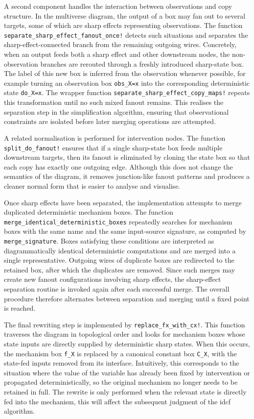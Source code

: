 \documentclass[a4paper]{report}
\begin{document}
A second component handles the interaction between observations and copy structure. In the multiverse diagram, the output of a box may fan out to several targets, some of which are sharp effects representing observations. The function \texttt{separate\_sharp\_effect\_fanout\_once!} detects such situations and separates the sharp-effect-connected branch from the remaining outgoing wires. 
Concretely, when an output feeds both a sharp effect and other downstream nodes, the non-observation branches are rerouted through a freshly introduced sharp-state box. 
The label of this new box is inferred from the observation whenever possible, for example turning an observation box \texttt{obs\_X=x} into the corresponding deterministic state \texttt{do\_X=x}. The wrapper function \texttt{separate\_sharp\_effect\_copy\_maps!} repeats this transformation until no such mixed fanout remains. This realises the separation step in the simplification algorithm, ensuring that observational constraints are isolated before later merging operations are attempted.

A related normalisation is performed for intervention nodes. 
The function \texttt{split\_do\_fanout!} ensures that if a single sharp-state box feeds multiple downstream targets, then its fanout is eliminated by cloning the state box so that each copy has exactly one outgoing edge. 
Although this does not change the semantics of the diagram, it removes junction-like fanout patterns and produces a cleaner normal form that is easier to analyse and visualise.

Once sharp effects have been separated, the implementation attempts to merge duplicated deterministic mechanism boxes. 
The function \texttt{merge\_identical\_deterministic\_boxes} repeatedly searches for mechanism boxes with the same name and the same input-source signature, as computed by \texttt{merge\_signature}. Boxes satisfying these conditions are interpreted as diagrammatically identical deterministic computations and are merged into a single representative. 
Outgoing wires of duplicate boxes are redirected to the retained box, after which the duplicates are removed. 
Since such merges may create new fanout configurations involving sharp effects, the sharp-effect separation routine is invoked again after each successful merge. The overall procedure therefore alternates between separation and merging until a fixed point is reached.

The final rewriting step is implemented by \texttt{replace\_fx\_with\_cx!}. This function traverses the diagram in topological order and looks for mechanism boxes whose state inputs are directly supplied by deterministic sharp states. When this occurs, the mechanism box \texttt{f\_X} is replaced by a canonical constant box \texttt{C\_X}, with the state-fed inputs removed from its interface. Intuitively, this corresponds to the situation where the value of the variable has already been fixed by intervention or propagated deterministically, so the original mechanism no longer needs to be retained in full. 
The rewrite is only performed when the relevant state is directly fed into the mechanism, this will affect the subsequent judgment of the idcf algorithm.
\end{document}
